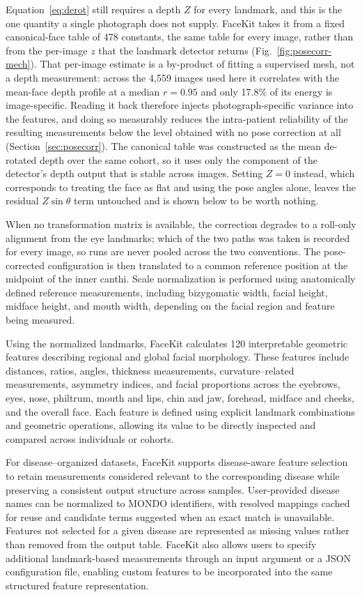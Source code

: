 \documentclass[11pt]{article}
\begin{document}
Equation~\eqref{eq:derot} still requires a depth $Z$ for every landmark, and this
is the one quantity a single photograph does not supply. FaceKit takes it from a
fixed canonical-face table of 478 constants, the same table for every image,
rather than from the per-image $z$ that the landmark detector returns
(Fig.~\ref{fig:posecorr-mech}). That per-image estimate is a by-product of
fitting a supervised mesh, not a depth measurement: across the 4,559 images used
here it correlates with the mean-face depth profile at a median $r=0.95$ and only
17.8\% of its energy is image-specific. Reading it back therefore injects
photograph-specific variance into the features, and doing so measurably reduces
the intra-patient reliability of the resulting measurements below the level
obtained with no pose correction at all (Section~\ref{sec:posecorr}). The
canonical table was constructed as the mean de-rotated depth over the same
cohort, so it uses only the component of the detector's depth output that is
stable across images. Setting $Z = 0$ instead, which corresponds to treating the
face as flat and using the pose angles alone, leaves the residual
$Z\sin\theta$ term untouched and is shown below to be worth nothing.

When no transformation matrix is available, the correction degrades to a
roll-only alignment from the eye landmarks; which of the two paths was taken is
recorded for every image, so runs are never pooled across the two conventions.
The pose-corrected configuration is then translated to a common reference
position at the midpoint of the inner canthi. Scale normalization is performed
using anatomically defined reference measurements, including bizygomatic width,
facial height, midface height, and mouth width, depending on the facial region
and feature being measured.

Using the normalized landmarks, FaceKit calculates 120 interpretable geometric features describing regional and global facial morphology. These features include distances, ratios, angles, thickness measurements, curvature--related measurements, asymmetry indices, and facial proportions across the eyebrows, eyes, nose, philtrum, mouth and lips, chin and jaw, forehead, midface and cheeks, and the overall face. Each feature is defined using explicit landmark combinations and geometric operations, allowing its value to be directly inspected and compared across individuals or cohorts.

For disease--organized datasets, FaceKit supports disease-aware feature selection to retain measurements considered relevant to the corresponding disease while preserving a consistent output structure across samples. User-provided disease names can be normalized to MONDO identifiers, with resolved mappings cached for reuse and candidate terms suggested when an exact match is unavailable. Features not selected for a given disease are represented as missing values rather than removed from the output table. FaceKit also allows users to specify additional landmark-based measurements through an input argument or a JSON configuration file, enabling custom features to be incorporated into the same structured feature representation.
\end{document}
